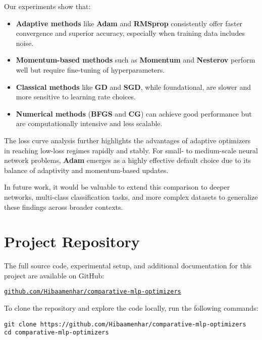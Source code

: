 \documentclass[12pt]{article}
\begin{document}
Our experiments show that:

\begin{itemize}
    \item \textbf{Adaptive methods} like \textbf{Adam} and \textbf{RMSprop} consistently offer faster convergence and superior accuracy, especially when training data includes noise.
    \item \textbf{Momentum-based methods} such as \textbf{Momentum} and \textbf{Nesterov} perform well but require fine-tuning of hyperparameters.
    \item \textbf{Classical methods} like \textbf{GD} and \textbf{SGD}, while foundational, are slower and more sensitive to learning rate choices.
    \item \textbf{Numerical methods} (\textbf{BFGS} and \textbf{CG}) can achieve good performance but are computationally intensive and less scalable.
\end{itemize}

The loss curve analysis further highlights the advantages of adaptive optimizers in reaching low-loss regimes rapidly and stably. For small- to medium-scale neural network problems, \textbf{Adam} emerges as a highly effective default choice due to its balance of adaptivity and momentum-based updates.

In future work, it would be valuable to extend this comparison to deeper networks, multi-class classification tasks, and more complex datasets to generalize these findings across broader contexts.


\section*{Project Repository}

The full source code, experimental setup, and additional documentation for this project are available on GitHub:

\begin{center}
\href{https://github.com/Hibaamenhar/comparative-mlp-optimizers}{\texttt{github.com/Hibaamenhar/comparative-mlp-optimizers}}
\end{center}

To clone the repository and explore the code locally, run the following commands:

\begin{verbatim}
git clone https://github.com/Hibaamenhar/comparative-mlp-optimizers
cd comparative-mlp-optimizers
\end{verbatim}
\end{document}
